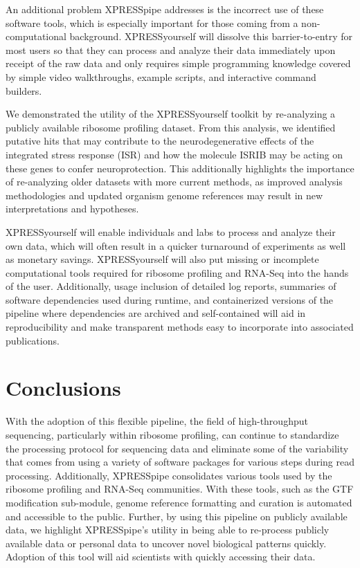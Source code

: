 \documentclass[10pt, oneside]{article}
\begin{document}
An additional problem XPRESSpipe addresses is the incorrect use of these software tools, which is especially important for those coming from a non-computational background. XPRESSyourself will dissolve this barrier-to-entry for most users so that they can process and analyze their data immediately upon receipt of the raw data and only requires simple programming knowledge covered by simple video walkthroughs, example scripts, and interactive command builders. \par

We demonstrated the utility of the XPRESSyourself toolkit by re-analyzing a publicly available ribosome profiling dataset. From this analysis, we identified putative hits that may contribute to the neurodegenerative effects of the integrated stress response (ISR) and how the molecule ISRIB may be acting on these genes to confer neuroprotection. This additionally highlights the importance of re-analyzing older datasets with more current methods, as improved analysis methodologies and updated organism genome references may result in new interpretations and hypotheses. \par

XPRESSyourself will enable individuals and labs to process and analyze their own data, which will often result in a quicker turnaround of experiments as well as monetary savings. XPRESSyourself will also put missing or incomplete computational tools required for ribosome profiling and RNA-Seq into the hands of the user. Additionally, usage inclusion of detailed log reports, summaries of software dependencies used during runtime, and containerized versions of the pipeline where dependencies are archived and self-contained will aid in reproducibility and make transparent methods easy to incorporate into associated publications. \par


\section{Conclusions}
With the adoption of this flexible pipeline, the field of high-throughput sequencing, particularly within ribosome profiling, can continue to standardize the processing protocol for sequencing data and eliminate some of the variability that comes from using a variety of software packages for various steps during read processing. Additionally, XPRESSpipe consolidates various tools used by the ribosome profiling and RNA-Seq communities. With these tools, such as the GTF modification sub-module, genome reference formatting and curation is automated and accessible to the public. Further, by using this pipeline on publicly available data, we highlight XPRESSpipe's utility in being able to re-process publicly available data or personal data to uncover novel biological patterns quickly. Adoption of this tool will aid scientists with quickly accessing their data.
\end{document}
